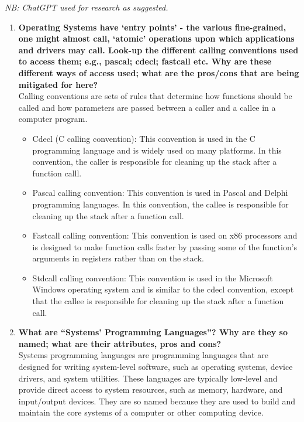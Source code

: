 
\textit{NB: ChatGPT used for research as suggested.}

\begin{enumerate}
    \item \textbf{Operating Systems have `entry points' - the various fine-grained, one might almost call, `atomic' operations upon which applications and drivers may call.  Look-up the different calling conventions used to access them; e.g., pascal; cdecl; fastcall etc.  Why are these different ways of access used; what are the pros/cons that are being mitigated for here?}\\
    Calling conventions are sets of rules that determine how functions should be called and how parameters are passed between a caller and a callee in a computer program.
    \begin{itemize}
        \item Cdecl (C calling convention): This convention is used in the C programming language and is widely used on many platforms. In this convention, the caller is responsible for cleaning up the stack after a function calll.
        \item Pascal calling convention: This convention is used in Pascal and Delphi programming languages. In this convention, the callee is responsible for cleaning up the stack after a function call.
        \item Fastcall calling convention: This convention is used on x86 processors and is designed to make function calls faster by passing some of the function's arguments in registers rather than on the stack.
        \item Stdcall calling convention: This convention is used in the Microsoft Windows operating system and is similar to the cdecl convention, except that the callee is responsible for cleaning up the stack after a function call.
    \end{itemize}
    \item \textbf{What are “Systems' Programming Languages”?  Why are they so named; what are their attributes, pros and cons?}\\
    Systems programming languages are programming languages that are designed for writing system-level software, such as operating systems, device drivers, and system utilities. These languages are typically low-level and provide direct access to system resources, such as memory, hardware, and input/output devices. They are so named because they are used to build and maintain the core systems of a computer or other computing device.

\end{enumerate}
